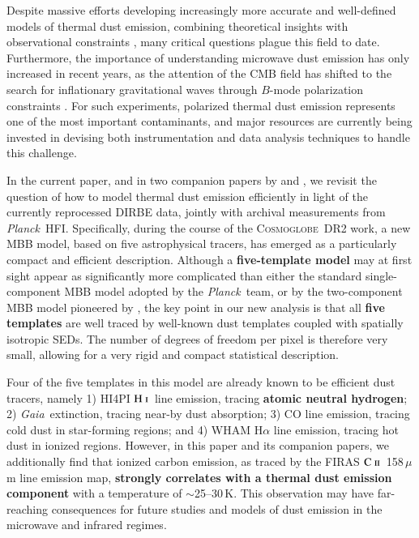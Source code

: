 \documentclass{aa}
\newcommand{\mathsc}[1]{{\normalfont\textsc{#1}}}
\def\Cosmoglobe{\textsc{Cosmoglobe}}
\def\Planck{\textit{Planck}}
\def\GAIA{\textit{Gaia}}
\newcommand{\CII}{\ensuremath{\mathsc{C\ ii}}}
\newcommand{\HI}{\ensuremath{\mathsc{H\ i}}}
\begin{document}
Despite massive efforts developing increasingly more accurate
and well-defined models of thermal dust emission, combining
theoretical insights with observational constraints \citep[e.g.,][]{draine2011,Hensley2023},
many critical questions plague this field to date. Furthermore,
the importance of understanding microwave dust emission has only increased in recent
years, as the attention of the CMB field has shifted to the search for
inflationary gravitational waves through $B$-mode polarization
constraints \citep[e.g.,][]{Bicep2018limit,SO2019,litebird2022}. For such experiments, polarized thermal dust emission
represents one of the most important contaminants, and major resources
are currently being invested in devising both instrumentation and
data analysis techniques to handle this challenge. 



In the current paper, and in two companion papers by \citet{CG02_06}
and \citet{CG02_07}, we revisit the question of how to model thermal
dust emission efficiently in light of the currently reprocessed DIRBE
data, jointly with archival measurements from
\Planck\ HFI. Specifically, during the course of the \Cosmoglobe\ DR2
work, a new MBB model, based on five astrophysical tracers, has emerged as a
particularly compact and efficient description. Although a \textbf{five-template model}
may at first sight appear as significantly more complicated than either the
standard single-component MBB model adopted by the \Planck\ team, or by the
two-component MBB model pioneered by \citet{finkbeiner:1999}, the key point in
our new analysis is that all \textbf{five templates} are well traced by well-known dust
templates coupled with spatially isotropic SEDs. The number of degrees of
freedom per pixel is therefore very small, allowing for a very rigid and
compact statistical description.

Four of the five templates in this model are already known to be
efficient dust tracers, namely 1) HI4PI \HI\ line emission, tracing
\textbf{atomic neutral hydrogen}; 2) \GAIA\ extinction, tracing near-by dust
absorption;
3) \citet{dame:2001} CO line emission, tracing cold dust in
star-forming regions; and 4) WHAM H$\alpha$ line emission, tracing hot
dust in ionized regions. However, in this paper and its companion
papers, we additionally find that ionized carbon emission, as traced
by the FIRAS \CII\ 158\,$\mu$m line emission map, \textbf{strongly correlates
with a thermal dust emission component} with a temperature of
$\sim$25--30\,K. This observation may have far-reaching consequences
for future studies and models of dust emission in the microwave and
infrared regimes.
\end{document}
